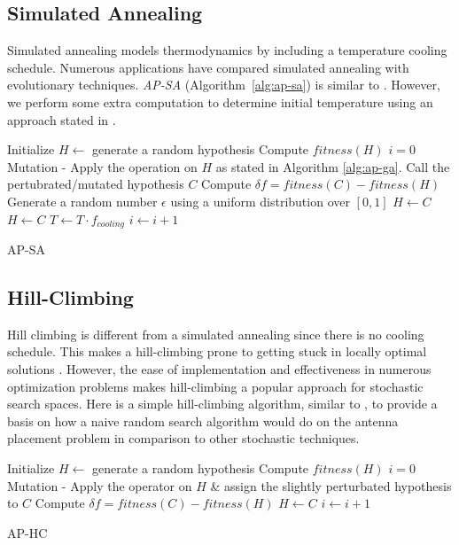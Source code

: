 \documentclass{sig-alternate}
\begin{document}
\subsection{Simulated Annealing}
\label{sec:algoriths-sa}
Simulated annealing models thermodynamics by including a temperature cooling schedule. Numerous applications \cite{sexton1999optimization,davis1987genetic} have compared simulated annealing with evolutionary techniques. \textit{AP-SA} (Algorithm~\ref{alg:ap-sa}) is similar to \cite{xu1990improved}. However, we perform some extra computation to determine initial temperature using an approach stated in \cite{ben2004computing}.
\begin{algorithm}[!ht]
Initialize $H\leftarrow$ generate a random hypothesis \;
Compute $fitness(H)$  \;
$i=0$ \;
 {
    Mutation - Apply the operation on $H$ as stated in Algorithm \ref{alg:ap-ga}. Call the pertubrated/mutated hypothesis $C$ \;
 Compute $\delta f = fitness(C) -fitness(H) $ \;
  {
 Generate a random number $\epsilon$ using a uniform distribution over $[0,1]$ \;
  {
 $H \leftarrow C$
 }}  {
 $H \leftarrow C$ \; }
 $T \leftarrow T \cdot f_{cooling}$ \;
 $i \leftarrow i + 1$ \;
} 
\caption{AP-SA}
\label{alg:ap-sa}
\end{algorithm}
\subsection{Hill-Climbing}
\label{sec:algoriths-hc}
Hill climbing is different from a simulated annealing since there is no cooling schedule. This makes a hill-climbing prone to getting stuck in locally optimal solutions \cite{michalewicz2000escaping, borghoff2011hill}. However, the ease of implementation and effectiveness in numerous optimization problems \cite{skalak1994prototype,xi2004smart} makes hill-climbing a popular approach for stochastic search spaces. Here is a simple hill-climbing algorithm, similar to \cite{skalak1994prototype}, to provide a basis on how a naive random search algorithm would do on the antenna placement problem in comparison to other stochastic techniques. 
\begin{algorithm}[!ht]
{}
Initialize $H\leftarrow$ generate a random hypothesis \;
Compute $fitness(H)$  \;
$i=0$ \;
 {
    Mutation - Apply the operator on $H$ \& assign the slightly perturbated hypothesis to $C$ \;
 Compute $\delta f = fitness(C) -fitness(H) $ \;
  {
 $H \leftarrow C$ }
 $i \leftarrow i + 1$
 }
\caption{AP-HC}
 \label{alg:ap-hc}
\end{algorithm}
\end{document}
